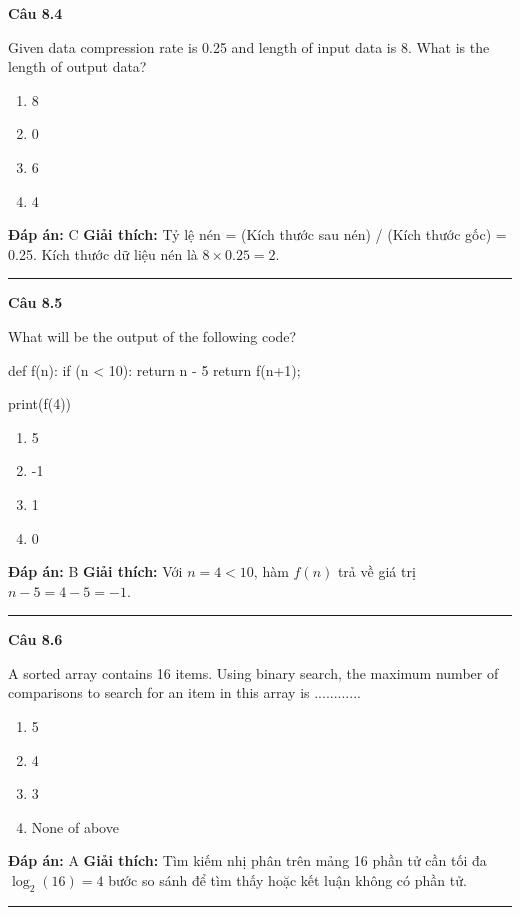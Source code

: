 \documentclass[11pt,a4paper]{article}
\newenvironment{question}[1]{%
  \par\vspace{1em}\noindent\textbf{\large Câu #1}\par\vspace{0.4em}
}{%
  \par\vspace{1em}\hrule\vspace{0.6em}
}
\newenvironment{choices}{%
  \begin{enumerate}[label=\textbf{\Alph*.},leftmargin=2.2em,itemsep=2pt,topsep=3pt]
}{%
  \end{enumerate}
}
\newcommand{\choice}{\item}
\newenvironment{codebox}{%
  \begin{tcolorbox}[colback=gray!8!white,colframe=gray!50!black,arc=1.5mm,boxrule=0.6pt,left=3mm,right=3mm,top=2.5mm,bottom=2.5mm]
  \ttfamily\small
}{%
  \end{tcolorbox}
}
\begin{document}
\begin{question}{8.4}
Given data compression rate is 0.25 and length of input data is 8. What is the length of output data?
\begin{choices}
\choice 8
\choice 0
\choice 6
\choice 4
\end{choices}
\textbf{Đáp án:} C
\textbf{Giải thích:} Tỷ lệ nén = (Kích thước sau nén) / (Kích thước gốc) = 0.25. Kích thước dữ liệu nén là \(8 \times 0.25 = 2\).
\end{question}

\begin{question}{8.5}
What will be the output of the following code?
\begin{codebox}
def f(n):
    if (n < 10):
        return n - 5
    return f(n+1);

print(f(4))
\end{codebox}
\begin{choices}
\choice 5
\choice -1
\choice 1
\choice 0
\end{choices}
\textbf{Đáp án:} B
\textbf{Giải thích:} Với \(n = 4 < 10\), hàm \(f(n)\) trả về giá trị \(n - 5 = 4 - 5 = -1\).
\end{question}

\begin{question}{8.6}
A sorted array contains 16 items. Using binary search, the maximum number of comparisons to search for an item in this array is ............
\begin{choices}
\choice 5
\choice 4
\choice 3
\choice None of above
\end{choices}
\textbf{Đáp án:} A
\textbf{Giải thích:} Tìm kiếm nhị phân trên mảng 16 phần tử cần tối đa \(\log_2(16) = 4\) bước so sánh để tìm thấy hoặc kết luận không có phần tử.
\end{question}
\end{document}
